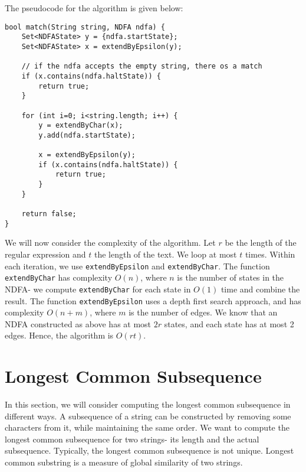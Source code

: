 \documentclass[a4paper, openany]{memoir}
\begin{document}
    The pseudocode for the algorithm is given below:
\begin{lstlisting}[language=pseudocode]
bool match(String string, NDFA ndfa) {
    Set<NDFAState> y = {ndfa.startState};
    Set<NDFAState> x = extendByEpsilon(y);
    
    // if the ndfa accepts the empty string, there os a match
    if (x.contains(ndfa.haltState)) {
        return true;
    }

    for (int i=0; i<string.length; i++) {
        y = extendByChar(x);
        y.add(ndfa.startState);

        x = extendByEpsilon(y);
        if (x.contains(ndfa.haltState)) {
            return true;
        }
    }

    return false;
}
\end{lstlisting}

    We will now consider the complexity of the algorithm. Let $r$ be the length of the regular expression and $t$ the length of the text. We loop at most $t$ times. Within each iteration, we use \texttt{extendByEpsilon} and \texttt{extendByChar}. The function \texttt{extendByChar} has complexity $O(n)$, where $n$ is the number of states in the NDFA- we compute \texttt{extendByChar} for each state in $O(1)$ time and combine the result. The function \texttt{extendByEpsilon} uses a depth first search approach, and has complexity $O(n+m)$, where $m$ is the number of edges. We know that an NDFA constructed as above has at most $2r$ states, and each state has at most 2 edges. Hence, the algorithm is $O(rt)$.
    \newpage

    \section{Longest Common Subsequence}
    In this section, we will consider computing the longest common subsequence in different ways. A subsequence of a string can be constructed by removing some characters from it, while maintaining the same order. We want to compute the longest common subsequence for two strings- its length and the actual subsequence. Typically, the longest common subsequence is not unique. Longest common substring is a measure of global similarity of two strings. 
\end{document}
